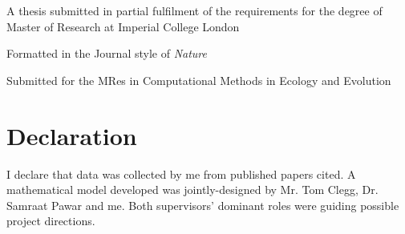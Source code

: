 \documentclass[../thesis.tex]{subfiles} %
\begin{document}
\maketitle
\vspace{15cm}
\begin{center}
    A thesis submitted in partial fulfilment of the requirements for the degree of Master of Research at Imperial College London
    
    Formatted in the Journal style of \textit{Nature}
    
    Submitted for the MRes in Computational Methods in Ecology and Evolution
\end{center}
\clearpage

\section{Declaration}
I declare that data was collected by me from published papers cited.  A mathematical model developed was jointly-designed by Mr. Tom Clegg, Dr. Samraat Pawar and me.  Both supervisors' dominant roles were guiding possible project directions.
\tableofcontents
\end{document}
